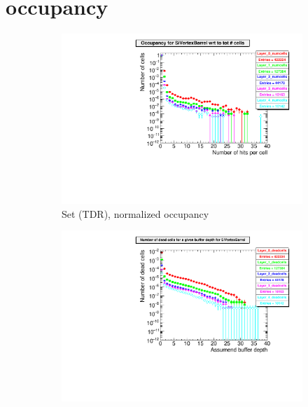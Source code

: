 \section{\sid occupancy}
\label{Appendix:Pairs:ILC250_occupancy}

  \begin{figure}
 \centering
   \begin{subfigure}[b]{0.49\textwidth}
   \centering
    \includegraphics[width=\textwidth]{Figures/Pairs/occupancy_numcells_SiVertexBarrel_ILC250_TDR.pdf}
   \caption{Set (TDR), normalized occupancy}
   \end{subfigure}
   \hfill
    \begin{subfigure}[b]{0.49\textwidth}
   \centering
    \includegraphics[width=\textwidth]{Figures/Pairs/occupancy_deadcells_SiVertexBarrel_ILC250_TDR.pdf}

\end{subfigure}
\end{figure}
